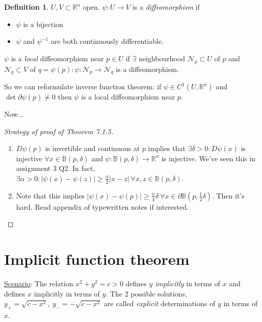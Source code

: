 \documentclass[a4paper]{article}
\theoremstyle{definition}
\newtheorem{defn}{Definition}[subsection]
\begin{document}
\begin{defn}
$U,V\subset \mathbb R^n$ open. $\psi:U\rightarrow V$ is a \textit{diffeomorphism} if \begin{itemize}
    \item $\psi$ is a bijection
    \item $\psi$ and $\psi^{-1}$ are both continuously differentiable.
\end{itemize}
$\psi$ is a \textit{local} diffeomorphism near $p\in U$ if $\exists$ neighbourhood $\mathcal N_p\subset U$ of $p$ and $\mathcal N_q\subset V$ of $q=\psi(p):\psi:\mathcal N_p\rightarrow \mathcal N_q$ is a diffeomorphism.
\end{defn}
So we can reformulate inverse function theorem: if $\psi \in C^1(U,\mathbb R^n)$ and $\det \partial \psi (p) \neq 0$ then $\psi$ is a local diffeomorphism near $p$.

Now...
\begin{proof}[Strategy of proof of Theorem 7.1.5]
\begin{enumerate}
    \item $D\psi(p)$ is invertible and continuous at $p$ implies that $\exists \delta>0 : D\psi (x)$ is injective $\forall x \in \mathbb B(p,\delta)$ and $\psi:\mathbb B(p,\delta) \rightarrow \mathbb R^n$ is injective. We've seen this in assignment 3 Q2. In fact, $\exists \alpha >0: |\psi(x)-\psi(z)| \geq \frac{\alpha}{2} |x-z| \ \forall x,z\in \mathbb B(p,\delta)$.
    \item Note that this implies $|\psi(x)-\psi(p)| \geq \frac{\alpha}{4} \delta \ \forall x\in \partial \mathbb B\left(p,\frac12 \delta \right)$. Then it's hard. Read appendix of typewritten notes if interested.
\end{enumerate}
\end{proof}

\section{Implicit function theorem}
\underline{Scenario}: The relation $x^2+y^2=c>0$ defines $y$ \textit{implicitly} in terms of $x$ and defines $x$ implicitly in terms of $y$. The 2 possible solutions, $y_+=\sqrt{c-x^2},\ y_-=-\sqrt{c-x^2}$ are called \textit{explicit} determinations of $y$ in terms of $x$.
\end{document}
